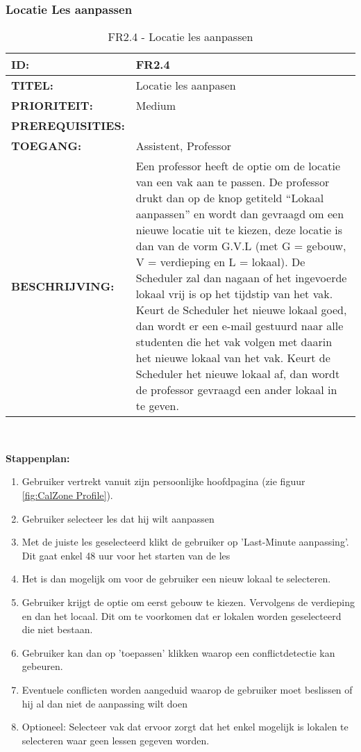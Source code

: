 \subsubsection{Locatie Les aanpassen} 
\noindent\begin{table}[H]
            \begin{tabular}{l | p{10cm}}
                \textbf{ID:} & FR2.4 \\ \hline
                \textbf{TITEL:} & Locatie les aanpasen\\ \hline
                \textbf{PRIORITEIT:} &  Medium \\ \hline
                \textbf{PREREQUISITIES:} & \\ \hline
                \textbf{TOEGANG:} & Assistent, Professor \\ \hline
                \textbf{BESCHRIJVING:} & Een professor heeft de optie om de locatie van een vak aan te passen. 
                                        De professor drukt dan op de knop getiteld “Lokaal aanpassen” en wordt dan gevraagd om een nieuwe locatie uit te kiezen, deze locatie is dan van de vorm G.V.L (met G = gebouw, V = verdieping en L = lokaal). De Scheduler zal dan nagaan of het ingevoerde lokaal vrij is op het tijdstip van het vak. Keurt de Scheduler het nieuwe lokaal goed, dan wordt er een e-mail gestuurd naar alle studenten die het vak volgen met daarin het nieuwe lokaal van het vak. Keurt de Scheduler het nieuwe lokaal af, dan wordt de professor gevraagd een ander lokaal in te geven.\\ 
            \end{tabular}\\
            \caption{FR2.4 - Locatie les aanpassen}
            \label{tab:FR2.4 - Locatie les aanpassen}
        \end{table}
        
\textbf{Stappenplan:}
	\begin{enumerate}
	\item Gebruiker vertrekt vanuit zijn persoonlijke hoofdpagina (zie figuur \ref{fig:CalZone Profile}).
	\item Gebruiker selecteer les dat hij wilt aanpassen
	\item Met de juiste les geselecteerd klikt de gebruiker op 'Last-Minute aanpassing'. Dit gaat enkel 48 uur voor het starten van de les
	\item Het is dan mogelijk om voor de gebruiker een nieuw lokaal te selecteren.
	\item Gebruiker krijgt de optie om eerst gebouw te kiezen. Vervolgens de verdieping en dan het locaal. Dit om te voorkomen dat er lokalen worden geselecteerd die niet bestaan.
	\item Gebruiker kan dan op 'toepassen' klikken waarop een conflictdetectie kan gebeuren.
	\item Eventuele conflicten worden aangeduid waarop de gebruiker moet beslissen of hij al dan niet de aanpassing wilt doen 
	\item Optioneel: Selecteer vak dat ervoor zorgt dat het enkel mogelijk is lokalen te selecteren waar geen lessen gegeven worden.
	\end{enumerate}	        
        

